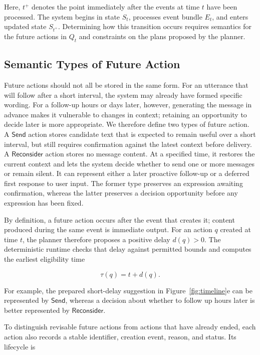 \documentclass[manuscript,nonacm]{acmart}
\begin{document}
Here, $t^+$ denotes the point immediately after the events at time $t$ have been
processed. The system begins in state $S_t$, processes event bundle $E_t$, and
enters updated state $S_{t^+}$. Determining how this transition occurs requires
semantics for the future actions in $Q_t$ and constraints on the plans proposed
by the planner.

\subsection{Semantic Types of Future Action}

Future actions should not all be stored in the same form. For an utterance that
will follow after a short interval, the system may already have formed specific
wording. For a follow-up hours or days later, however, generating the message in
advance makes it vulnerable to changes in context; retaining an opportunity to
decide later is more appropriate. We therefore define two types of future
action. A $\mathsf{Send}$ action stores candidate text that is expected to
remain useful over a short interval, but still requires confirmation against the
latest context before delivery. A $\mathsf{Reconsider}$ action stores no message
content. At a specified time, it restores the current context and lets the
system decide whether to send one or more messages or remain silent. It can
represent either a later proactive follow-up or a deferred first response to
user input. The former type preserves an expression awaiting confirmation,
whereas the latter preserves a decision opportunity before any expression has
been fixed.

By definition, a future action occurs after the event that creates it; content
produced during the same event is immediate output. For an action $q$ created at
time $t$, the planner therefore proposes a positive delay $d(q)>0$. The
deterministic runtime checks that delay against permitted bounds and computes the
earliest eligibility time

\begin{equation}
\tau(q)=t+d(q).
\end{equation}

For example, the prepared short-delay suggestion in
Figure~\ref{fig:timeline}e can be represented by $\mathsf{Send}$, whereas a
decision about whether to follow up hours later is better represented by
$\mathsf{Reconsider}$.

To distinguish revisable future actions from actions that have already ended,
each action also records a stable identifier, creation event, reason, and status.
Its lifecycle is
\end{document}
